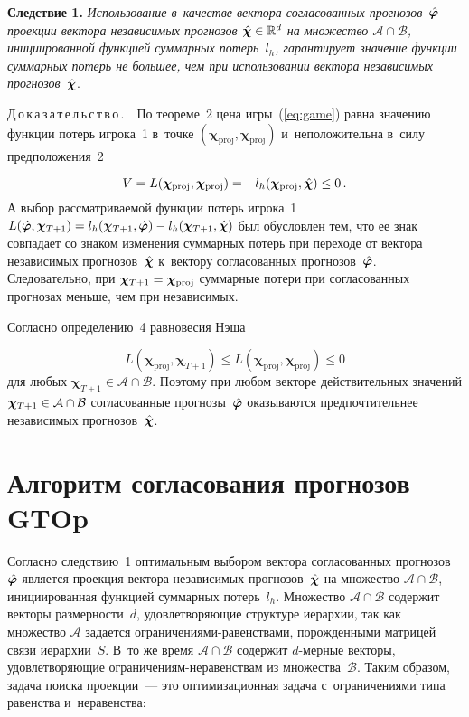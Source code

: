 \begin{multicols}{2}
\smallskip


\noindent
\textbf{Следствие 1.} %
\textit{Использование в~качестве вектора согласованных прогнозов~$\hat{\boldsymbol{\varphi}}$
проекции вектора независимых прогнозов $\hchi\hm \in \mathbb{R}^d$ на
множество $\mathcal{A} \cap \mathcal{B}$, инициированной функцией
суммарных потерь~$l_h$, гарантирует значение функции суммарных потерь не большее,
чем при использовании вектора независимых прогнозов}~$\hat{\boldsymbol{\chi}}$.


\noindent
Д\,о\,к\,а\,з\,а\,т\,е\,л\,ь\,с\,т\,в\,о\,.\ \
По теореме~2 цена игры~(\ref{eq:game}) равна
значению функции потерь игрока~1 в~точке
$(\boldsymbol{\chi}_{\mathrm{proj}}, \boldsymbol{\chi}_{\mathrm{proj}})$
и~неположительна в~силу предположения~2

\vspace*{2pt}

\noindent
$$
    V = L(\boldsymbol{\chi}_{\mathrm{proj}}, \boldsymbol{\chi}_{\mathrm{proj}})
    = -l_h(\boldsymbol{\chi}_{\mathrm{proj}}, \hat{\boldsymbol{\chi}})
    \leq 0\,.
$$
А выбор рассматриваемой функции потерь игрока~1 $L(\hphi,
\boldsymbol{\chi}_{T+1})\hm = l_h(\boldsymbol{\chi}_{T+1}, \hphi) \hm-
l_h(\boldsymbol{\chi}_{T+1}, \hchi)$ был обусловлен тем, что ее
знак совпадает со знаком изменения суммарных потерь при переходе
от вектора независимых прогнозов~$\hat{\boldsymbol{\chi}}$ к~вектору согласованных
прогнозов~$\hat{\boldsymbol{\varphi}}$. Следовательно, при $\boldsymbol{\chi}_{T+1} \hm=
\boldsymbol{\chi}_{\mathrm{proj}}$ суммарные потери при согласованных
прогнозах меньше, чем при независимых.

Согласно определению~4 равновесия Нэша

\vspace*{2pt}

\noindent
$$
    L(\boldsymbol{\chi}_{\mathrm{proj}}, \boldsymbol{\chi}_{T+1}) \leq
    L(\boldsymbol{\chi}_{\mathrm{proj}}, \boldsymbol{\chi}_{\mathrm{proj}}) \leq 0
    $$
 для любых  $\boldsymbol{\chi}_{T+1} \in \mathcal{A} \cap \mathcal{B}$.
Поэтому при любом векторе действительных значений
$\boldsymbol{\chi}_{T+1} \hm\in \mathcal{A} \cap \mathcal{B}$ согласованные
прогнозы~$\hat{\boldsymbol{\varphi}}$ оказываются предпочтительнее независимых
прогнозов~$\hat{\boldsymbol{\chi}}$.

\section{Алгоритм согласования прогнозов GTOp}

Согласно следствию~1 оптимальным
выбором вектора согласованных прогнозов~$\hat{\boldsymbol{\varphi}}$ является проекция
вектора независимых прогнозов~$\hat{\boldsymbol{\chi}}$ на множество $\mathcal{A} \cap \mathcal{B}$,
инициированная функцией суммарных потерь~$l_h$. Множество $\mathcal{A} \cap
\mathcal{B}$ содержит векторы размерности~$d$, удовлетворяющие структуре
иерархии, так как множество $\mathcal{A}$ задается
огра\-ни\-че\-ни\-ями-ра\-вен\-ст\-ва\-ми, порожденными матрицей
связи иерархии~$S$. В~то же время $\mathcal{A} \cap \mathcal{B}$ содержит
\mbox{$d$-мер}\-ные векторы,
удовлетворяющие огра\-ни\-че\-ни\-ям-не\-ра\-вен\-ст\-вам из множества~$\mathcal{B}$. Таким
образом, задача поиска проекции~--- это оптимизационная задача с~ограничениями типа равенства и~неравенства:


\end{multicols}
